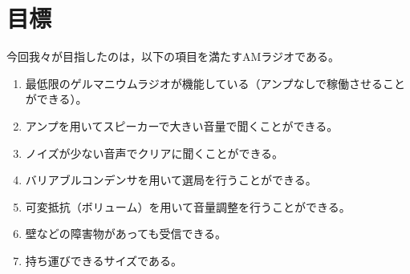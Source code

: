 \documentclass[report.tex]{subfiles}
\begin{document}
\section{目標}\label{sec:目標}

今回我々が目指したのは，以下の項目を満たすAMラジオである。

\begin{enumerate}
  \item 最低限のゲルマニウムラジオが機能している（アンプなしで稼働させることができる）。
  \item アンプを用いてスピーカーで大きい音量で聞くことができる。
  \item ノイズが少ない音声でクリアに聞くことができる。
  \item バリアブルコンデンサを用いて選局を行うことができる。
  \item 可変抵抗（ボリューム）を用いて音量調整を行うことができる。
  \item 壁などの障害物があっても受信できる。
  \item 持ち運びできるサイズである。
\end{enumerate}
\end{document}
